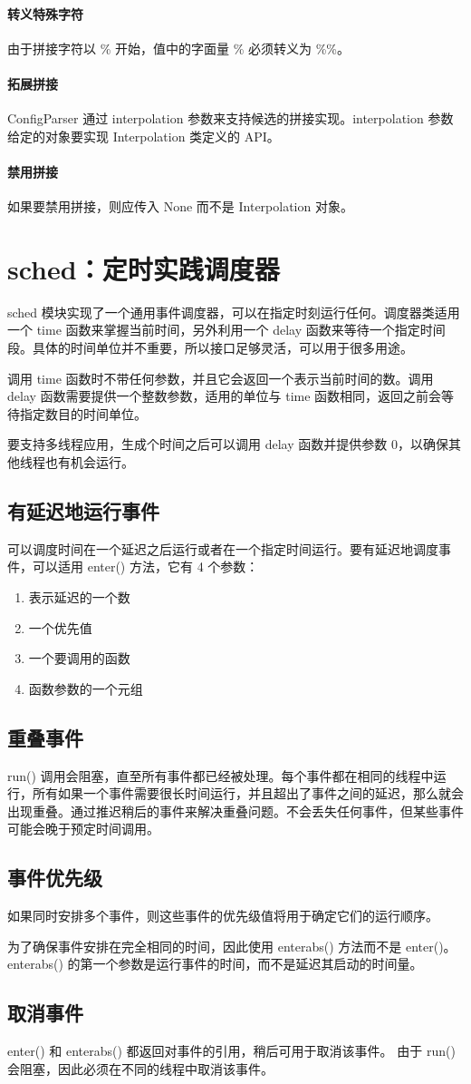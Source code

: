 \paragraph{转义特殊字符} 由于拼接字符以 \% 开始，值中的字面量 \% 必须转义为 \%\%。

\paragraph{拓展拼接} ConfigParser 通过 interpolation 参数来支持候选的拼接实现。interpolation 参数给定的对象要实现 Interpolation 类定义的 API。
\paragraph{禁用拼接} 如果要禁用拼接，则应传入 None 而不是 Interpolation 对象。
\section{sched：定时实践调度器}
sched 模块实现了一个通用事件调度器，可以在指定时刻运行任何。调度器类适用一个 time 函数来掌握当前时间，另外利用一个 delay 函数来等待一个指定时间段。具体的时间单位并不重要，所以接口足够灵活，可以用于很多用途。

调用 time 函数时不带任何参数，并且它会返回一个表示当前时间的数。调用 delay 函数需要提供一个整数参数，适用的单位与 time 函数相同，返回之前会等待指定数目的时间单位。

要支持多线程应用，生成个时间之后可以调用 delay 函数并提供参数 0，以确保其他线程也有机会运行。
\subsection{有延迟地运行事件}
可以调度时间在一个延迟之后运行或者在一个指定时间运行。要有延迟地调度事件，可以适用 enter() 方法，它有 4 个参数：
\begin{enumerate}
    \item 表示延迟的一个数
    \item 一个优先值
    \item 一个要调用的函数
    \item 函数参数的一个元组
\end{enumerate}

\subsection{重叠事件}
run() 调用会阻塞，直至所有事件都已经被处理。每个事件都在相同的线程中运行，所有如果一个事件需要很长时间运行，并且超出了事件之间的延迟，那么就会出现重叠。通过推迟稍后的事件来解决重叠问题。不会丢失任何事件，但某些事件可能会晚于预定时间调用。
\subsection{事件优先级}
如果同时安排多个事件，则这些事件的优先级值将用于确定它们的运行顺序。

为了确保事件安排在完全相同的时间，因此使用 enterabs() 方法而不是 enter()。 enterabs() 的第一个参数是运行事件的时间，而不是延迟其启动的时间量。

\subsection{取消事件}
enter() 和 enterabs() 都返回对事件的引用，稍后可用于取消该事件。 由于 run() 会阻塞，因此必须在不同的线程中取消该事件。